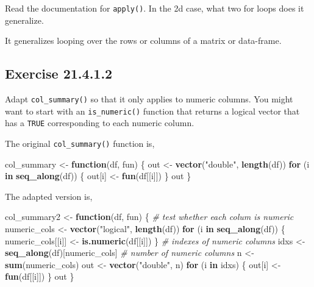 \documentclass[]{book}
\newenvironment{Shaded}{\begin{snugshade}}{\end{snugshade}}
\newcommand{\CommentTok}[1]{\textcolor[rgb]{0.56,0.35,0.01}{\textit{#1}}}
\newcommand{\ControlFlowTok}[1]{\textcolor[rgb]{0.13,0.29,0.53}{\textbf{#1}}}
\newcommand{\KeywordTok}[1]{\textcolor[rgb]{0.13,0.29,0.53}{\textbf{#1}}}
\newcommand{\NormalTok}[1]{#1}
\newcommand{\StringTok}[1]{\textcolor[rgb]{0.31,0.60,0.02}{#1}}
\theoremstyle{plain}
\theoremstyle{remark}
\begin{document}
Read the documentation for \texttt{apply()}. In the 2d case, what two
for loops does it generalize.

It generalizes looping over the rows or columns of a matrix or
data-frame.

\hypertarget{exercise-21.4.1.2}{%
\subsection*{\texorpdfstring{Exercise
{21.4.1.2}}{Exercise 21.4.1.2}}\label{exercise-21.4.1.2}}

Adapt \texttt{col\_summary()} so that it only applies to numeric
columns. You might want to start with an \texttt{is\_numeric()} function
that returns a logical vector that has a \texttt{TRUE} corresponding to
each numeric column.

The original \texttt{col\_summary()} function is,

\begin{Shaded}
\begin{Highlighting}[]
\NormalTok{col_summary <-}\StringTok{ }\ControlFlowTok{function}\NormalTok{(df, fun) \{}
\NormalTok{  out <-}\StringTok{ }\KeywordTok{vector}\NormalTok{(}\StringTok{"double"}\NormalTok{, }\KeywordTok{length}\NormalTok{(df))}
  \ControlFlowTok{for}\NormalTok{ (i }\ControlFlowTok{in} \KeywordTok{seq_along}\NormalTok{(df)) \{}
\NormalTok{    out[i] <-}\StringTok{ }\KeywordTok{fun}\NormalTok{(df[[i]])}
\NormalTok{  \}}
\NormalTok{  out}
\NormalTok{\}}
\end{Highlighting}
\end{Shaded}

The adapted version is,

\begin{Shaded}
\begin{Highlighting}[]
\NormalTok{col_summary2 <-}\StringTok{ }\ControlFlowTok{function}\NormalTok{(df, fun) \{}
  \CommentTok{# test whether each colum is numeric}
\NormalTok{  numeric_cols <-}\StringTok{ }\KeywordTok{vector}\NormalTok{(}\StringTok{"logical"}\NormalTok{, }\KeywordTok{length}\NormalTok{(df))}
  \ControlFlowTok{for}\NormalTok{ (i }\ControlFlowTok{in} \KeywordTok{seq_along}\NormalTok{(df)) \{}
\NormalTok{    numeric_cols[[i]] <-}\StringTok{ }\KeywordTok{is.numeric}\NormalTok{(df[[i]])}
\NormalTok{  \}}
  \CommentTok{# indexes of numeric columns}
\NormalTok{  idxs <-}\StringTok{ }\KeywordTok{seq_along}\NormalTok{(df)[numeric_cols]}
  \CommentTok{# number of numeric columns}
\NormalTok{  n <-}\StringTok{ }\KeywordTok{sum}\NormalTok{(numeric_cols)}
\NormalTok{  out <-}\StringTok{ }\KeywordTok{vector}\NormalTok{(}\StringTok{"double"}\NormalTok{, n)}
  \ControlFlowTok{for}\NormalTok{ (i }\ControlFlowTok{in}\NormalTok{ idxs) \{}
\NormalTok{    out[i] <-}\StringTok{ }\KeywordTok{fun}\NormalTok{(df[[i]])}
\NormalTok{  \}}
\NormalTok{  out}
\NormalTok{\}}
\end{Highlighting}
\end{Shaded}
\end{document}
